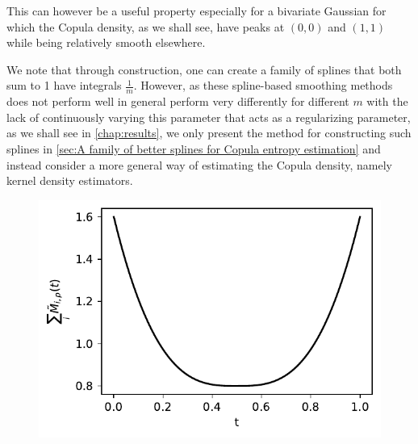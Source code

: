 \documentclass[../Thesis.tex]{subfiles}
\begin{document}
This can however be a useful property especially for a bivariate Gaussian for which the Copula density, as we shall see, have peaks at $(0,0)$ and $(1,1)$ while being relatively smooth elsewhere.

We note that through construction, one can create a family of splines that both sum to 1 have integrals $\frac{1}{m}$. However, as these spline-based smoothing methods does not perform well in general perform very differently for different $m$ with the lack of continuously varying this parameter that acts as a regularizing parameter, as we shall see in \autoref{chap:results}, we only present the method for constructing such splines in \autoref{sec:A family of better splines for Copula entropy estimation} and instead consider a more general way of estimating the Copula density, namely kernel density estimators.

\begin{figure}[ht]
    \centering
    \includegraphics[width = .55\linewidth]{figures/MI estimation/M-spline coefficient sum - degree 3.pdf}
    \caption{}
    \label{fig:M-spline functions sum}
\end{figure}









\newpage
\end{document}

